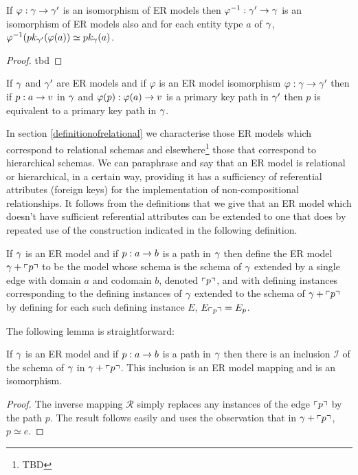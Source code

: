 \begin{lemma}
If $\varphi: \gmodel \morph \gmodel'$ is an isomorphism of ER models then
$\varphi^{-1}: \gmodel' \morph \gmodel$ is an isomorphism of ER models also and
for each entity type $a$ of $\gmodel$, $\varphi^{-1}(\pk[\gmodel']{\varphi(a)}\simeq\pk{a}$.
\end{lemma}
\begin{proof}
tbd
\end{proof}

\begin{lemma}
 
If $\gmodel$ and $\gmodel'$ are ER models and if $\varphi$ is an ER model isomorphism $\varphi: \gmodel \morph \gmodel'$ then if $p:a \morph \veee$ in $\gmodel$ and $\varphi(p) :\varphi(a) \morph \veee$ is a primary key path in $\gmodel'$ then $p$ is equivalent to a primary key path in $\gmodel$.
\end{lemma}

In section \ref{definitionofrelational} we characterise those ER models which correspond to relational schemas and elsewhere\footnote{TBD} those that correspond to hierarchical schemas. 
We can paraphrase and say that an ER model is relational or hierarchical, in a certain way,  providing it has a sufficiency of referential attributes (foreign keys) for the implementation  of non-compositional relationships. It follows from the definitions that we give that an ER model which doesn't have sufficient 
referential attributes can be extended to one that does by repeated use of the construction indicated in the following definition.
\begin{definition}
If $\gmodel$ is an ER model and if $p:a \morph b$ is a path in $\gmodel$ then define the ER model $\gmodel + \qq{p}$ to be the model whose schema is the schema of $\gmodel$ extended by a single edge with domain $a$ and codomain $b$, denoted $\qq{p}$, and with defining instances corresponding to the defining instances of $\gmodel$ extended to the schema of $\gmodel + \qq{p}$ by defining for each such defining instance $E$, $E_{\qq{p}}=E_p$.
\end{definition} 


The following lemma is straightforward:
\begin{lemma}
If $\gmodel$ is an ER model and if $p:a \morph b$ is a path in $\gmodel$ then
there is an inclusion  $\mathcal{I}$ of the schema of $\gmodel$ in $\gmodel + \qq{p}$. This inclusion is an ER model mapping and is an isomorphism. 
\end{lemma}
\begin{proof}
The inverse mapping $\mathcal{R}$ simply replaces any instances of the edge $\qq{p}$ by the path $p$. The result follows easily and uses the observation that in $\gmodel + \qq{p}$, $p \simeq e$.
\end{proof}


